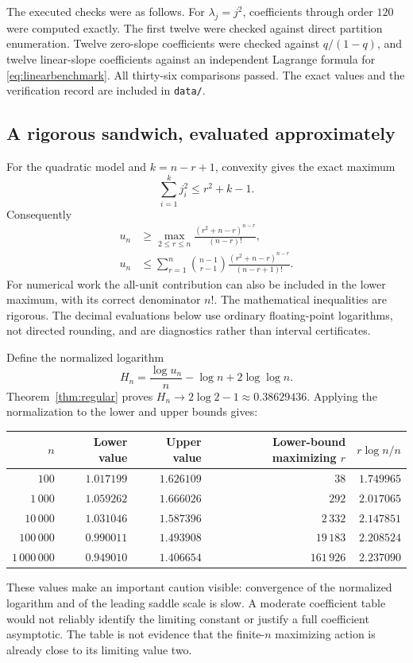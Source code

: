 \documentclass[11pt,a4paper]{article}
\numberwithin{equation}{section}
\theoremstyle{definition}
\theoremstyle{remark}
\begin{document}
The executed checks were as follows.  For $\lambda_j=j^2$, coefficients
through order $120$ were computed exactly.  The first twelve were checked
against direct partition enumeration.  Twelve zero-slope coefficients
were checked against $q/(1-q)$, and twelve linear-slope coefficients
against an independent Lagrange formula for \eqref{eq:linearbenchmark}.
All thirty-six comparisons passed.  The exact values and the verification
record are included in \texttt{data/}.

\subsection{A rigorous sandwich, evaluated approximately}
For the quadratic model and $k=n-r+1$, convexity gives the exact maximum
\[
 \sum_{i=1}^k j_i^2\le r^2+k-1.
\]
Consequently
\begin{align}
 u_n&\ge
 \max_{2\le r\le n}
 \frac{(r^2+n-r)^{n-r}}{(n-r)!},
 \label{eq:quadraticlower}\\
 u_n&\le\sum_{r=1}^n\binom{n-1}{r-1}
       \frac{(r^2+n-r)^{n-r}}{(n-r+1)!}.
 \label{eq:quadraticupper}
\end{align}
For numerical work the all-unit contribution can also be included in the
lower maximum, with its correct denominator $n!$.  The mathematical
inequalities are rigorous.  The decimal evaluations below use ordinary
floating-point logarithms, not directed rounding, and are diagnostics
rather than interval certificates.

Define the normalized logarithm
\[
 H_n=\frac{\log u_n}{n}-\log n+2\log\log n.
\]
Theorem~\ref{thm:regular} proves $H_n\to2\log2-1\approx0.38629436$.
Applying the normalization to the lower and upper bounds gives:
\begin{center}
\begin{tabular}{@{}rrrrr@{}}
\toprule
$n$ & Lower value & Upper value & Lower-bound maximizing $r$ & $r\log n/n$\\
\midrule
$100$ & $1.017199$ & $1.626109$ & $38$ & $1.749965$\\
$1\,000$ & $1.059262$ & $1.666026$ & $292$ & $2.017065$\\
$10\,000$ & $1.031046$ & $1.587396$ & $2\,332$ & $2.147851$\\
$100\,000$ & $0.990011$ & $1.493908$ & $19\,183$ & $2.208524$\\
$1\,000\,000$ & $0.949010$ & $1.406654$ & $161\,926$ & $2.237090$\\
\bottomrule
\end{tabular}
\end{center}
These values make an important caution visible: convergence of the
normalized logarithm and of the leading saddle scale is slow.  A moderate
coefficient table would not reliably identify the limiting constant or
justify a full coefficient asymptotic.  The table is not evidence that the
finite-$n$ maximizing action is already close to its limiting value two.
\end{document}
